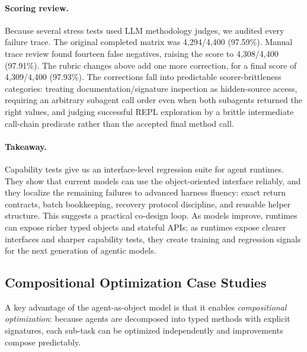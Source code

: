 \documentclass[11pt, logo, onecolumn, copyright, colorlinks=true, allcolors=blue]{nvidiatechreport}
\begin{document}
\paragraph{Scoring review.}
Because several stress tests used LLM methodology judges, we audited every
failure trace. The original completed matrix was 4,294/4,400 (97.59\%). Manual
trace review found fourteen false negatives, raising the score to 4,308/4,400
(97.91\%). The rubric changes above add one more correction, for a final score
of 4,309/4,400 (97.93\%). The corrections fall into predictable scorer-brittleness
categories: treating documentation/signature inspection as hidden-source access,
requiring an arbitrary subagent call order even when both subagents returned the
right values, and judging successful REPL exploration by a brittle intermediate
call-chain predicate rather than the accepted final method call.

\paragraph{Takeaway.}
Capability tests give us an interface-level regression suite for agent runtimes.
They show that current models can use the object-oriented interface reliably, and
they localize the remaining failures to advanced harness fluency: exact return
contracts, batch bookkeeping, recovery protocol discipline, and reusable helper
structure. This suggests a practical co-design loop. As models improve, runtimes
can expose richer typed objects and stateful APIs; as runtimes expose clearer
interfaces and sharper capability tests, they create training and regression
signals for the next generation of agentic models.


\subsection{Compositional Optimization Case Studies}
\label{sec:optimization}

A key advantage of the agent-as-object model is that it enables
\emph{compositional optimization}: because agents are decomposed into typed
methods with explicit signatures, each sub-task can be optimized independently
and improvements compose predictably.
\end{document}
